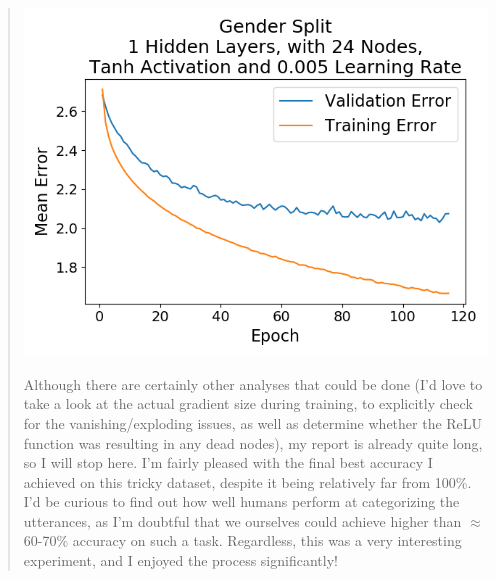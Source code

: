 \documentclass{article}
\begin{document}
\begin{quote}
\begin{center}
	\includegraphics[scale=0.35]{figs/final_analysis_best.png}
\end{center}

Although there are certainly other analyses that could be done (I'd love to take a look at the actual gradient size during training, to explicitly check for the vanishing/exploding issues, as well as determine whether the ReLU function was resulting in any dead nodes), my report is already quite long, so I will stop here. I'm fairly pleased with the final best accuracy I achieved on this tricky dataset, despite it being relatively far from 100\%. I'd be curious to find out how well humans perform at categorizing the utterances, as I'm doubtful that we ourselves could achieve higher than $\approx$ 60-70\% accuracy on such a task. Regardless, this was a very interesting experiment, and I enjoyed the process significantly!
	
	
\end{quote} 
\end{document}
